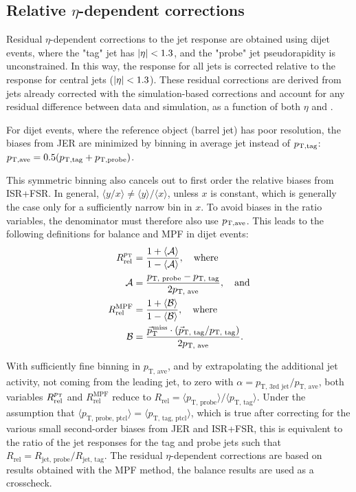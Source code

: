\documentclass[11pt,twoside,a4paper,cmspaper,final,collab]{cms-tdr}
\begin{document}
\subsection{Relative \texorpdfstring{$\eta$-dependent}{eta-dependent} corrections}\label{sec:relative}
\label{sec:l2res}

Residual $\eta$-dependent corrections to the jet response are obtained using dijet events, where the "tag" jet has $\lvert \eta \rvert<1.3$, and the "probe" jet pseudorapidity is unconstrained.
In this way, the response for all jets is corrected relative to the response for central jets ($\lvert \eta \rvert<1.3$). These residual corrections are derived from jets already corrected with the simulation-based corrections and account for any residual difference between data and simulation, as a function of both $\eta$ and \pt.

For dijet events, where the reference object (barrel jet) has poor resolution,
the biases from JER are
minimized by binning in average jet \pt instead of $p_{\mathrm{T},\rm tag}$: $p_{\mathrm{T},\rm ave}=0.5(p_{\mathrm{T},\rm tag} + p_{\mathrm{T},\rm probe})$.

This symmetric \pt binning also cancels out to first order the relative biases from ISR+FSR.
In general, $\langle y / x\rangle \neq \langle y\rangle/\langle x\rangle$, unless $x$ is constant, which is generally the case only for a sufficiently narrow bin in $x$. To avoid biases in the ratio variables, the denominator must therefore also use $p_{\mathrm{T},\rm ave}$.
This leads to the following definitions for \pt balance and MPF in dijet events:
\begin{align}
R_\text{rel}^{p_{\mathrm{T}}} &=
\frac{1+\langle\mathcal{A}\rangle}
     {1-\langle\mathcal{A}\rangle},\quad\text{where}\\
\mathcal{A} &= \frac{p_\text{T, probe} - p_\text{T, tag}}{2 p_\text{T, ave}},
\quad\text{and}\\
R_\text{rel}^\mathrm{MPF} &=
\frac{1+\langle\mathcal{B}\rangle}
     {1-\langle\mathcal{B}\rangle},\quad\text{where}\\
\mathcal{B} &=
\frac{{\vec p}_{\mathrm{T}}^{\kern1pt\text{miss}}\cdot (\vec{p}_\text{T, tag}/p_\text{T, tag})}
     {2 p_\text{T, ave}}.
\end{align}

With sufficiently fine binning in $p_\text{T, ave}$, and by extrapolating the additional jet activity, not coming from the leading jet, to zero with $\alpha=p_\text{T, 3rd jet}/p_\text{T, ave}$, both variables $R_\text{rel}^{p_{\mathrm{T}}}$ and $R_\text{rel}^\mathrm{MPF}$ reduce to $R_\text{rel}=\langle p_\text{T, probe}\rangle / \langle p_\text{T, tag}\rangle$. Under the assumption that $\langle p_\text{T, probe, ptcl}\rangle=\langle p_\text{T, tag, ptcl}\rangle$,
which is true after correcting for the various small second-order biases from JER and ISR+FSR, this is equivalent to the ratio of the jet responses for the tag and probe jets such that $R_\text{rel} =  R_\text{jet, probe} / R_\text{jet, tag}$. The residual $\eta$-dependent corrections are based on results obtained with the MPF method, the \pt balance results are used as a crosscheck.
\end{document}
